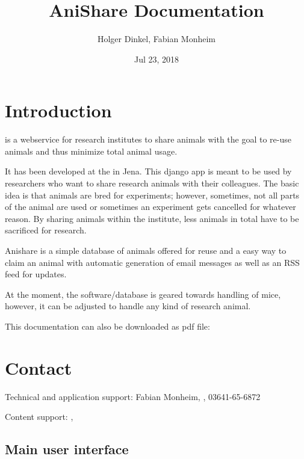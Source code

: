 \documentclass[letterpaper,10pt,openany,oneside,english]{sphinxmanual}
\title{AniShare Documentation}
\date{Jul 23, 2018}
\author{Holger Dinkel, Fabian Monheim}
\begin{document}
\maketitle
\sphinxtableofcontents
{}\label{\detokenize{index::doc}}



\chapter{Introduction}
\label{\detokenize{index:introduction}}
 is a webservice for research institutes to share animals with the goal to re-use
animals and thus minimize total animal usage.

It has been developed at the  in
Jena. This django app is meant to be used by researchers who want to share research animals with
their colleagues. The basic idea is that animals are bred for experiments; however, sometimes, not
all parts of the animal are used or sometimes an experiment gets cancelled for whatever reason. By
sharing animals within the institute, less animals in total have to be sacrificed for research.

Anishare is a simple database of animals offered for reuse and a easy way to claim an animal with
automatic generation of email messages as well as an RSS feed for updates.

\noindent{}

At the moment, the software/database is geared towards handling of mice, however, it can be adjusted
to handle any kind of research animal.

This documentation can also be downloaded as pdf file: 


\chapter{Contact}
\label{\detokenize{index:contact}}
Technical and application support: Fabian Monheim, , 03641-65-6872

Content support: , 


\section{Main user interface}
\label{\detokenize{index:main-user-interface}}
\end{document}
